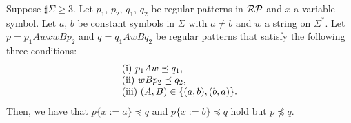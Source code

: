 \begin{lem}\label{Sato1:Lemma13}
    Suppose $\sharp\Sigma \geq 3$.
    Let $p_{1}$, $p_{2}$, $q_{1}$, $q_{2}$ be regular patterns in $\mathcal{RP}$ and $x$ a variable symbol.
    Let $a$, $b$ be constant symbols in $\Sigma$ with $a \neq b$ and $w$ a string on $\Sigma^{\ast}$.
    Let $p = p_{1}AwxwBp_{2}$ and $q = q_{1}AwBq_{2}$ be regular patterns that satisfy the following three conditions:
    \[
        \begin{tabular}{ll}
            $\mathrm{(i)}~p_{1}Aw \preceq q_{1}$,  \\ %
            $\mathrm{(ii)}~wBp_{2} \preceq q_{2}$, \\
            $\mathrm{(iii)}$ %
            $(A,B)\in \{(a,b),(b,a)\}$.
        \end{tabular}
    \]
    Then, we have that $p\{x:=a\} \preceq q$ and $p\{x:=b\} \preceq q$ hold 
    but $p \not\preceq q$.
\end{lem}






